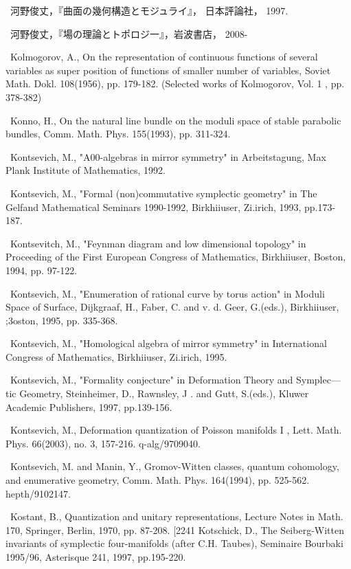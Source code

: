 {\noindent [211]\ 河野俊丈，『曲面の幾何構造とモジュライ』， 日本評論社， 1997.\par\smallskip
\noindent [212]\ 河野俊丈，『場の理論とトポロジ一』，岩波書店， 2008-\par\smallskip
\noindent [213]\ Kolmogorov, A., On the representation of continuous functions of several variables as super position of functions of smaller number of variables, Soviet Math. Dokl. 108(1956), pp. 179-182. (Selected works of Kolmogorov, Vol. 1 , pp. 378-382)\par\smallskip
\noindent [214]\ Konno, H., On the natural line bundle on the moduli space of stable parabolic bundles, Comm. Math. Phys. 155(1993), pp. 311-324.\par\smallskip
\noindent [215]\ Kontsevich, M., "A00-algebras in mirror symmetry" in Arbeitstagung, Max Plank Institute of Mathematics, 1992.\par\smallskip
\noindent [216]\ Kontsevich, M., "Formal (non)commutative symplectic geometry" in The Gelfand Mathematical Seminars 1990-1992, Birkhiiuser, Zi.irich, 1993, pp.173-187.\par\smallskip
\noindent [217]\ Kontsevitch, M., "Feynman diagram and low dimensional topology" in Proceeding of the First European Congress of Mathematics, Birkhiiuser, Boston, 1994, pp. 97-122.\par\smallskip
\noindent [218]\ Kontsevich, M., "Enumeration of rational curve by torus action" in Moduli Space of Surface, Dijkgraaf, H., Faber, C. and v. d. Geer, G.(eds.), Birkhiiuser, ;3oston, 1995, pp. 335-368.\par\smallskip
\noindent [219]\ Kontsevich, M., "Homological algebra of mirror symmetry" in International Congress of Mathematics, Birkhiiuser, Zi.irich, 1995.\par\smallskip
\noindent [220]\ Kontsevich, M., "Formality conjecture" in Deformation Theory and Symplec— tic Geometry, Steinheimer, D., Rawnsley, J . and Gutt, S.(eds.), Kluwer Academic Publishers, 1997, pp.139-156.\par\smallskip
\noindent [221]\ Kontsevich, M., Deformation quantization of Poisson manifolds I , Lett. Math. Phys. 66(2003), no. 3, 157-216. q-alg/9709040.\par\smallskip
\noindent [222]\ Kontsevich, M. and Manin, Y., Gromov-Witten classes, quantum cohomology, and enumerative geometry, Comm. Math. Phys. 164(1994), pp. 525-562. hepth/9102147.\par\smallskip
\noindent [223]\ Kostant, B., Quantization and unitary representations, Lecture Notes in Math. 170, Springer, Berlin, 1970, pp. 87-208. [2241 Kotschick, D., The Seiberg-Witten invariants of symplectic four-manifolds (after C.H. Taubes), Seminaire Bourbaki 1995/96, Asterisque 241, 1997, pp.195-220.\par\smallskip
}
